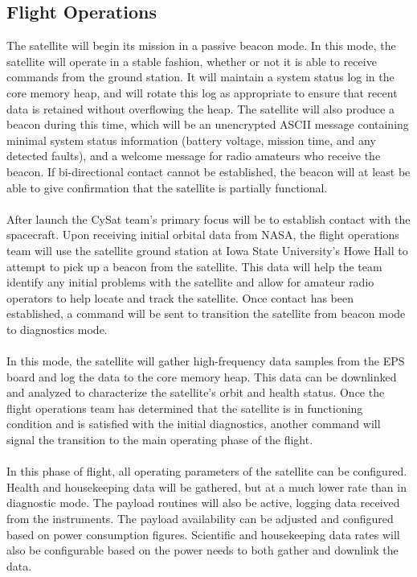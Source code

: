 \documentclass[nocover]            %
{CSLI}                       %
\begin{document}
\subsection{Flight Operations}
The satellite will begin its mission in a passive beacon mode. In this mode, the satellite will operate in a stable fashion, whether or not it is able to receive commands from the ground station. It will maintain a system status log in the core memory heap, and will rotate this log as appropriate to ensure that recent data is retained without overflowing the heap. The satellite will also produce a beacon during this time, which will be an unencrypted ASCII message containing minimal system status information (battery voltage, mission time, and any detected faults), and a welcome message for radio amateurs who receive the beacon. If bi-directional contact cannot be established, the beacon will at least be able to give confirmation that the satellite is partially functional.\\
\\After launch the CySat team's primary focus will be to establish contact with the spacecraft. Upon receiving initial orbital data from NASA, the flight operations team will use the satellite ground station at Iowa State University's Howe Hall to attempt to pick up a beacon from the satellite. This data will help the team identify any initial problems with the satellite and allow for amateur radio operators to help locate and track the satellite. Once contact has been established, a command will be sent to transition the satellite from beacon mode to diagnostics mode.\\
\\In this mode, the satellite will gather high-frequency data samples from the EPS board and log the data to the core memory heap. This data can be downlinked and analyzed to characterize the satellite's orbit and health status. Once the flight operations team has determined that the satellite is in functioning condition and is satisfied with the initial diagnostics, another command will signal the transition to the main operating phase of the flight.\\
\\In this phase of flight, all operating parameters of the satellite can be configured. Health and housekeeping data will be gathered, but at a much lower rate than in diagnostic mode. The payload routines will also be active, logging data received from the instruments. The payload availability can be adjusted and configured based on power consumption figures. Scientific and housekeeping data rates will also be configurable based on the power needs to both gather and downlink the data.\\
\end{document}
